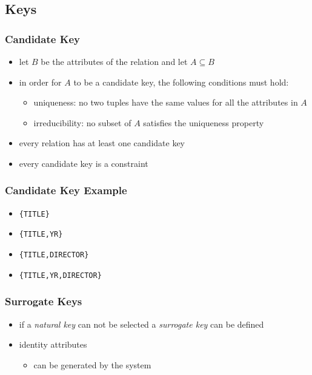 \documentclass[dvipsnames]{beamer}
\theoremstyle{plain}
\begin{document}
\subsection{Keys}

\begin{frame}
  \frametitle{Candidate Key}

  \begin{itemize}
    \item let $B$ be the attributes of the relation and let $A \subseteq B$

    \item in order for $A$ to be a candidate key, the following conditions
      must hold:

    \pause
    \begin{itemize}
      \item \alert{uniqueness}: no two tuples have the same values for all
        the attributes in $A$

      \pause
      \item \alert{irreducibility}: no subset of $A$ satisfies the uniqueness
        property
    \end{itemize}

    \pause
    \item every relation has at least one candidate key

    \pause
    \item every candidate key is a constraint
  \end{itemize}
\end{frame}

\begin{frame}
  \frametitle{Candidate Key Example}

  \begin{example}
    \begin{itemize}
      \item \texttt{\{TITLE\}}

      \pause
      \item \texttt{\{TITLE,YR\}}

      \pause
      \item \texttt{\{TITLE,DIRECTOR\}}

      \pause
      \item \texttt{\{TITLE,YR,DIRECTOR\}}
    \end{itemize}
  \end{example}
\end{frame}

\begin{frame}
  \frametitle{Surrogate Keys}

  \begin{itemize}
    \item if a \emph{natural key} can not be selected a \emph{surrogate key}
      can be defined

    \pause
    \medskip
    \item identity attributes
    \begin{itemize}
      \item can be generated by the system
    \end{itemize}
  \end{itemize}
\end{frame}
\end{document}
